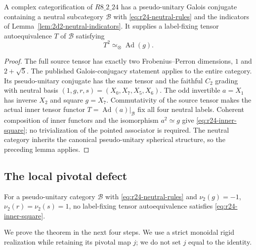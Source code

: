 \begin{proposition}
\label{prop:r24-reduction}
A complex categorification of $R8\_2\_24$ has a pseudo-unitary Galois
conjugate containing a neutral subcategory $\mathcal B$ with
\eqref{eq:r24-neutral-rules} and the indicators of
Lemma~\ref{lem:2d2-neutral-indicators}. It supplies a label-fixing tensor
autoequivalence $T$ of $\mathcal B$ satisfying
\begin{equation}\label{eq:r24-inner-square}
 T^2\simeq_{\otimes}\operatorname{Ad}(g).
\end{equation}
\end{proposition}
\begin{proof}
The full source tensor has exactly two Frobenius--Perron dimensions,
$1$ and $2+\sqrt5$. The published Galois-conjugacy statement
\cite[Lemma~3.1]{SchNear} applies to the entire category. Its
pseudo-unitary conjugate has the same tensor and the faithful $C_2$
grading with neutral basis $(1,g,r,s)=(X_0,X_7,X_5,X_6)$.
The odd invertible $a=X_1$ has inverse $X_2$ and square $g=X_7$.
Commutativity of the source tensor makes the actual inner tensor functor
$T=\operatorname{Ad}(a)|_{\mathcal B}$ fix all four neutral labels.
Coherent composition of inner functors and the isomorphism $a^2\simeq g$
give \eqref{eq:r24-inner-square}; no trivialization of the pointed
associator is required. The neutral category inherits the canonical
pseudo-unitary spherical structure, so the preceding lemma applies.
\end{proof}

\subsection{The local pivotal defect}
\begin{theorem}
\label{thm:r24-no-square-root}
For a pseudo-unitary category $\mathcal B$ with
\eqref{eq:r24-neutral-rules} and
$\nu_2(g)=-1$, $\nu_2(r)=\nu_2(s)=1$, no label-fixing tensor
autoequivalence satisfies \eqref{eq:r24-inner-square}.
\end{theorem}
We prove the theorem in the next four steps. We use a strict monoidal
rigid realization while retaining its pivotal map $j$; we do not set
$j$ equal to the identity.

